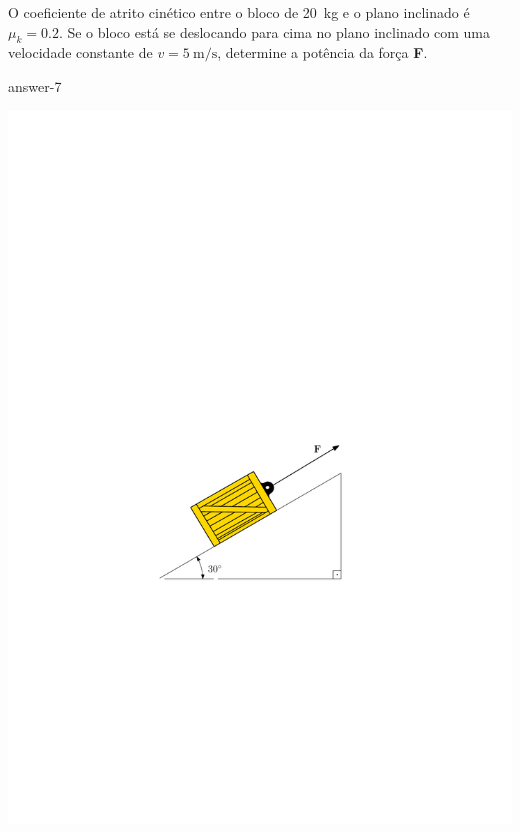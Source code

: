 
\item O coeficiente de atrito cinético entre o bloco de \SI{20}{\kilogram} e o plano inclinado é $\mu_{k}=0.2$. Se o bloco está se deslocando para cima no plano inclinado com uma velocidade constante de $v=\SI{5}{\meter/\second}$, determine a potência da força \textbf{F}.

{answer-7}

\vspace{1cm}
\begin{flushright}
    \includegraphics[]{images/draw_7.pdf}
\end{flushright}